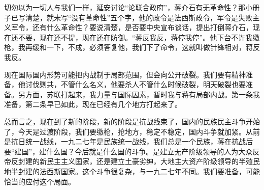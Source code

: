 切勿以为一切人与我们一样，延安讨论“论联合政府”，蒋介石有无革命性？那小册子已写清楚，就未写“没有革命性”五个字，他的政令是法西斯政令，军令是失败主义军令，还有什么革命性？要说清楚，是否要中央宣布谈话，提出打倒蒋介石，现在还不要，现在还不提，现在还在防御。“蒋反我反，蒋停我停”。他下台不许我缴枪，我再缓和一下，不成，必须答复他，我们下了命令，这就叫做针锋相对，蒋反我反。

现在国际国内形势可能把内战制于局部范围，但会向公开破裂。我们要有精神准备，他讨伐剿共，不管什么名义，他要杀人不管什么时候破裂，明天破裂也要准备。另方面，苏联打起来，我力量与国际因素，暂时我与蒋有局部内战。第一条我准备，第二条早已如此，现在已经有几个地方打起来了。

总而言之，现在到了新的阶段，新的阶段是抗战线束了，国内的民族民主斗争开始了，今天是过渡阶段，我们要缴枪，抢地方，稳定不稳定，国内斗争就加紧。从前是抗日统一战线，一九二七年是民族统一战线，我们总是一个民族，蒋在抗战后要“建国”，建什么国？今后就是什么国的斗争。是建立无产阶级领导的人为大众反帝反封建的新民主主义国家，还是建立土豪劣绅，大地主大资产阶级领导的半殖民地半封建的法西斯国家。这个斗争很复杂，与一九二七年不同。我们要准备，可能恰当的应付这个局面。

